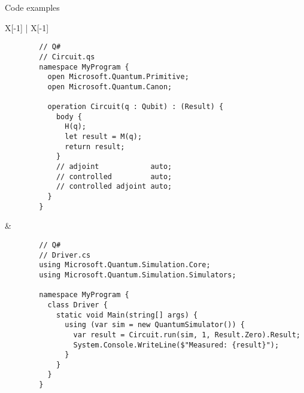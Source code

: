 \documentclass[a4paper, landscape]{article}
\begin{document}
\vspace{0.5cm}
{\Large Code examples} \\
\begin{tabu*}{ X[-1] | X[-1] }
	\begin{verbatim}
		// Q#
		// Circuit.qs
		namespace MyProgram {
		  open Microsoft.Quantum.Primitive;
		  open Microsoft.Quantum.Canon;

		  operation Circuit(q : Qubit) : (Result) {
		    body {
		      H(q);
		      let result = M(q);
		      return result;
		    }
		    // adjoint            auto;
		    // controlled         auto;
		    // controlled adjoint auto;
		  }
		}
	\end{verbatim}
	&
	\begin{verbatim}
		// Q#
		// Driver.cs
		using Microsoft.Quantum.Simulation.Core;
		using Microsoft.Quantum.Simulation.Simulators;

		namespace MyProgram {
		  class Driver {
		    static void Main(string[] args) {
		      using (var sim = new QuantumSimulator()) {
		        var result = Circuit.run(sim, 1, Result.Zero).Result;
		        System.Console.WriteLine($"Measured: {result}");
		      }
		    }
		  }
		}
	\end{verbatim}
\end{tabu*}

\newpage
\end{document}
